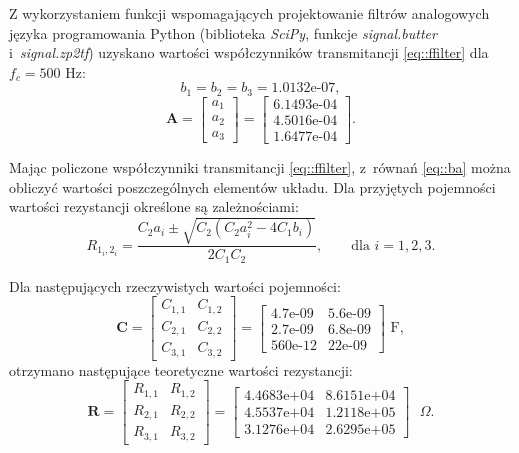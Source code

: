 Z wykorzystaniem funkcji wspomagających projektowanie filtrów analogowych języka
programowania Python (biblioteka \textit{SciPy}, funkcje \textit{signal.butter}
i~\textit{signal.zp2tf}) uzyskano wartości współczynników transmitancji
\ref{eq::ffilter} dla $f_c = 500$ Hz:
\begin{equation}
    b_1 = b_2 = b_3 = 1.0132\text{e-07},
\end{equation}
\begin{equation}
    \textbf{A} = \begin{bmatrix}
        a_1 \\
        a_2 \\
        a_3
    \end{bmatrix} = \begin{bmatrix}
        6.1493\text{e-04} \\
        4.5016\text{e-04} \\
        1.6477\text{e-04}
    \end{bmatrix}.
\end{equation}

Mając policzone współczynniki transmitancji \ref{eq::ffilter}, z~równań
\ref{eq::ba} można obliczyć wartości poszczególnych elementów układu. Dla
przyjętych pojemności wartości rezystancji określone są zależnościami:
\begin{equation}
    R_{1_{i},2_{i}} = \frac{C_2a_i \pm \sqrt{C_2(C_2a^2_i - 4C_1b_i)}}{2C_1C_2},
    \qquad \text{dla } i = 1,2,3.
\end{equation}

Dla następujących rzeczywistych wartości pojemności:
\begin{equation}
    \textbf{C} = \begin{bmatrix}
        C_{1,1} & C_{1,2} \\
        C_{2,1} & C_{2,2} \\
        C_{3,1} & C_{3,2}
    \end{bmatrix} = \begin{bmatrix}
        4.7\text{e-09}& 5.6\text{e-09} \\
        2.7\text{e-09} & 6.8\text{e-09} \\
        560\text{e-12} & 22\text{e-09}
    \end{bmatrix} \text{ F},
\end{equation}
otrzymano następujące teoretyczne wartości rezystancji:
\begin{equation}
        \textbf{R} = \begin{bmatrix}
            R_{1,1} & R_{1,2} \\
            R_{2,1} & R_{2,2} \\
            R_{3,1} & R_{3,2}
        \end{bmatrix} = \begin{bmatrix}
            4.4683\text{e+04} & 8.6151\text{e+04} \\
            4.5537\text{e+04} & 1.2118\text{e+05} \\
            3.1276\text{e+04} & 2.6295\text{e+05}
        \end{bmatrix} \text{ }\Omega.
\end{equation}

